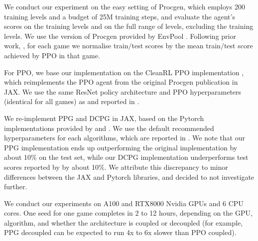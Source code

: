 We conduct our experiment on the easy setting of Procgen, which employs 200 training levels and a budget of 25M training steps, and evaluate the agent's scores on the training levels and on the full range of levels, excluding the training levels. We use the version of Procgen provided by EnvPool \citep{weng2022envpool}. Following prior work, \citep{raileanu2021UCB-DrAC,PLR,DCPG}, for each game we normalise train$/$test scores by the mean train$/$test score achieved by PPO in that game. 

For PPO, we base our implementation on the CleanRL PPO implementation \citep{huang2022cleanrl}, which reimplements the PPO agent from the original Procgen publication in JAX. We use the same ResNet policy architecture and PPO hyperparameters (identical for all games) as \citet{procgen} and reported in .

We re-implement PPG and DCPG in JAX, based on the Pytorch implementations provided by \citet{huang2022cleanrl} and \citet{DCPG}. We use the default recommended hyperparameters for each algorithms, which are reported in . We note that our PPG implementation ends up outperforming the original implementation by about 10\% on the test set, while our DCPG implementation underperforms test scores reported by \citet{DCPG} by about 10\%. %
We attribute this discrepancy to minor differences between the JAX and Pytorch libraries, and decided to not investigate further. 

We conduct our experiments on A100 and RTX8000 Nvidia GPUs and 6 CPU cores. One seed for one game completes in 2 to 12 hours, depending on the GPU, algorithm, and whether the architecture is coupled or decoupled (for example, PPG decoupled can be expected to run 4x to 6x slower than PPO coupled).



